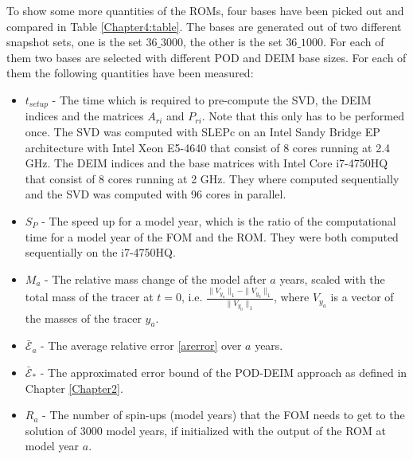 To show some more quantities of the ROMs, four bases have been picked out and compared in Table \ref{Chapter4:table}.
The bases are generated out of two different snapshot sets, one is the set $36\_3000$, the other is the set $36\_1000$.
For each of them two bases are selected with different POD and DEIM base sizes.
For each of them the following quantities have been measured:
\begin{itemize}
 \item $t_{setup}$ - The time which is required to pre-compute the SVD, the DEIM indices and the matrices $A_{ri}$ and $P_{ri}$. Note that this only has to be performed once. 
 The SVD was computed with SLEPc on an Intel\textsuperscript{\textregistered} Sandy Bridge EP architecture with Intel Xeon\textsuperscript{\textregistered}  E5-4640 that consist of 8 cores running at 2.4 GHz. The DEIM indices and the base matrices with 
 Intel Core\textsuperscript{\textregistered} i7-4750HQ that consist of 8 cores running at 2 GHz. They where computed sequentially and the SVD was computed with 96 cores in parallel.
 \item $S_P$ - The speed up for a model year, which is the ratio of the computational time for a model year of the FOM and the ROM. They were both computed sequentially on the i7-4750HQ.
 \item $M_{a}$ - The relative mass change of the model after $a$ years, scaled with the total mass of the tracer at $t=0$, i.e. $\frac{\parallel V_{y_a} \parallel_1 - \parallel V_{y_0} \parallel_1}{\parallel V_{y_0} \parallel_1}$, where $V_{y_a}$ is a vector 
 of the masses of the tracer $y_a$. 
 \item $\bar{\mathcal{E}}_{a}$ - The average relative error \eqref{arerror} over $a$ years. 
 \item $\bar{\mathcal{E}}_{*}$ - The approximated error bound of the POD-DEIM approach as defined in Chapter \ref{Chapter2}. 
 \item $R_{a}$ - The number of spin-ups (model years) that the FOM needs to get to the solution of 3000 model years, if initialized with the output of the ROM at model year $a$. 
\end{itemize}

